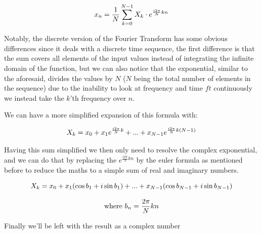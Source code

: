 \documentclass[
  oneside,
  11pt, a4paper,
  footinclude=true,
  headinclude=true,
  cleardoublepage=empty
]{scrbook}
\newcommand{\eqname}[1]{\tag*{#1}}%
\begin{document}
\begin{equation} \label{eq:inverse-discrete-fourier-transform}
    x_{n} = \frac{1}{N} \sum_{k=0}^{N-1}X_{k} \cdot e^{\frac{i 2 \pi}{N}kn} \\ %
\end{equation}

Notably, the discrete version of the Fourier Transform has some obvious differences since it deals with a discrete time sequence, the first difference is that the sum covers all elements of the input values instead of integrating the infinite domain of the function, but we can also notice that the exponential, similar to the aforesaid, divides the values by \(N\) (\(N\) being the total number of elements in the sequence) due to the inability to look at frequency and time \(ft\) continuously we instead take the \(k\)'th frequency over \(n\).

We can have a more simplified expansion of this formula with:

\begin{equation*}
    X_{k} = x_{0} + x_{1}e^{\frac{i 2 \pi}{N}k} + ... + x_{N-1}e^{\frac{i 2 \pi}{N}k(N-1)} \\
\end{equation*}

Having this sum simplified we then only need to resolve the complex exponential, and we can do that by replacing the \(e^{\frac{i 2 \pi}{N}kn}\) by the euler formula as mentioned before to reduce the maths to a simple sum of real and imaginary numbers.

\begin{equation} \label{dft_reduction}
    X_{k} = x_{0} + x_{1} (\cos{b_{1}} + i\sin{b_{1}}) + ... + x_{N-1} (\cos{b_{N-1}} + i\sin{b_{N-1}}) \\
\end{equation}

\begin{equation*}
    \text{where } \\ b_{n} = \frac{ 2 \pi}{N}kn \\
\end{equation*}


Finally we'll be left with the result as a complex number
\end{document}
